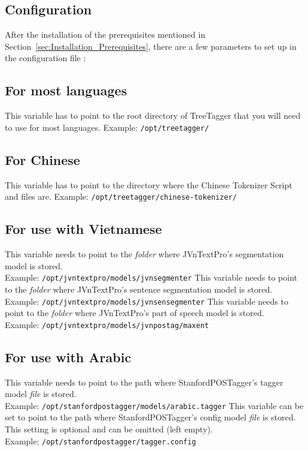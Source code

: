 \subsection{Configuration}\label{sec:Installation_Configuration}
After the installation of the prerequisites mentioned in Section~\ref{sec:Installation_Prerequisites}, there are a few parameters to set up in the configuration file \configFile{}:
\begin{itemize}

\subsection*{\textbf{For most languages}}
This variable has to point to the root directory of TreeTagger that you will need to use for most languages.
Example: \texttt{/opt/treetagger/}

\subsection*{\textbf{For Chinese}}
This variable has to point to the directory where the Chinese Tokenizer Script and files are.
Example: \texttt{/opt/treetagger/chinese-tokenizer/}

\subsection*{\textbf{For use with Vietnamese}}
This variable needs to point to the \textit{folder} where JVnTextPro's segmentation model is stored. \\
Example: \texttt{/opt/jvntextpro/models/jvnsegmenter}
This variable needs to point to the \textit{folder} where JVnTextPro's sentence segmentation model is stored. \\
Example: \texttt{/opt/jvntextpro/models/jvnsensegmenter}
This variable needs to point to the \textit{folder} where JVnTextPro's part of speech model is stored. \\
Example: \texttt{/opt/jvntextpro/models/jvnpostag/maxent}

\subsection*{\textbf{For use with Arabic}}
This variable needs to point to the path where StanfordPOSTagger's tagger model \textit{file} is stored. \\
Example: \texttt{/opt/stanfordpostagger/models/arabic.tagger}
This variable can be set to point to the path where StanfordPOSTagger's config model \textit{file} is stored. This setting is optional and can be omitted (left empty). \\
Example: \texttt{/opt/stanfordpostagger/tagger.config}


\end{itemize}
